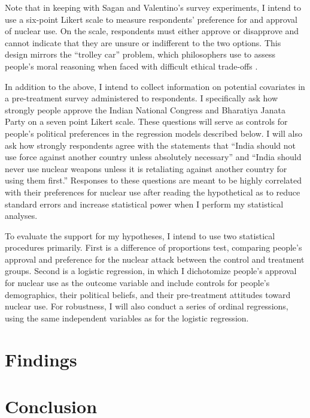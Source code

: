 \documentclass[12pt]{article}
\begin{document}
Note that in keeping with Sagan and Valentino's survey experiments, I intend to use a six-point Likert scale to measure respondents' preference for and approval of nuclear use. On the scale, respondents must either approve or disapprove and cannot indicate that they are unsure or indifferent to the two options. This design mirrors the ``trolley car'' problem, which philosophers use to assess people's moral reasoning when faced with difficult ethical trade-offs \citep{sagan_does_2020}.

In addition to the above, I intend to collect information on potential covariates in a pre-treatment survey administered to respondents. I specifically ask how strongly people approve the Indian National Congress and Bharatiya Janata Party on a seven point Likert scale. These questions will serve as controls for people's political preferences in the regression models described below. I will also ask how strongly respondents agree with the statements that ``India should not use force against another country unless absolutely necessary'' and ``India should never use nuclear weapons unless it is retaliating against another country for using them first.'' Responses to these questions are meant to be highly correlated with their preferences for nuclear use after reading the hypothetical as to reduce standard errors and increase statistical power when I perform my statistical analyses.

To evaluate the support for my hypotheses, I intend to use two statistical procedures primarily. First is a difference of proportions test, comparing people's approval and preference for the nuclear attack between the control and treatment groups. Second is a logistic regression, in which I dichotomize people's approval for nuclear use as the outcome variable and include controls for people's demographics, their political beliefs, and their pre-treatment attitudes toward nuclear use. For robustness, I will also conduct a series of ordinal regressions, using the same independent variables as for the logistic regression.

\section{Findings}

\section{Conclusion}


\end{document}
